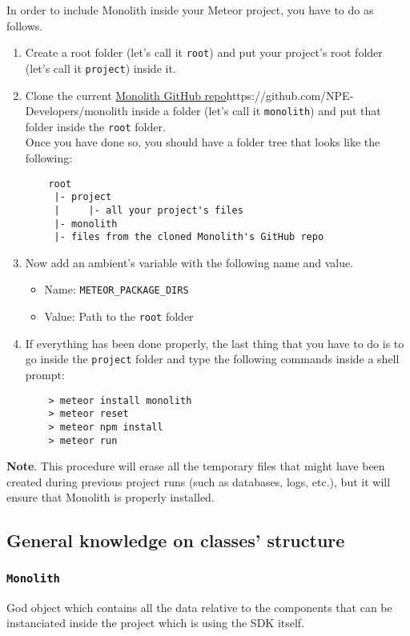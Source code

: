 In order to include Monolith inside your Meteor project, you have to do as follows.
\begin{enumerate}
	\item Create a root folder (let's call it \texttt{root}) and put your project's root folder (let's call it \texttt{project}) inside it.
	
	\item Clone the current \url{Monolith GitHub repo}{https://github.com/NPE-Developers/monolith} inside a folder (let's call it \texttt{monolith}) and put that folder inside the \texttt{root} folder. \\
Once you have done so, you should have a folder tree that looks like the following:
	\begin{lstlisting}
    root
     |- project
     |     |- all your project's files
     |- monolith
     |- files from the cloned Monolith's GitHub repo

	\end{lstlisting}
	
	\item Now add an ambient's variable with the following name and value.
	\begin{itemize}
		\item Name: \texttt{METEOR\_PACKAGE\_DIRS}
		\item Value:  Path to the \texttt{root} folder
	\end{itemize}

	\item If everything has been done properly, the last thing that you have to do is to go inside the \texttt{project} folder and type the following commands inside a shell prompt:
	\begin{lstlisting}
    > meteor install monolith
    > meteor reset
    > meteor npm install
    > meteor run
	\end{lstlisting}

\end{enumerate}

\textbf{Note}. This procedure will erase all the temporary files that might have been created during previous project runs (such as databases, logs, etc.), but it will ensure that Monolith is properly installed.


\subsection{General knowledge on classes' structure}
\subsubsection{\texttt{Monolith}}
God object which contains all the data relative to the components that can be instanciated inside the project which is using the SDK itself.

